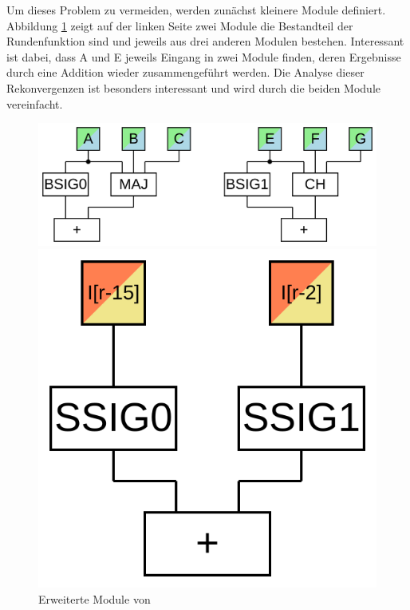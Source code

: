 Um dieses Problem zu vermeiden, werden zunächst kleinere Module definiert. Abbildung \ref{fig:sha256M} zeigt auf der linken
Seite zwei Module die Bestandteil der Rundenfunktion sind und jeweils aus drei anderen Modulen bestehen. Interessant ist dabei,
dass A und E jeweils Eingang in zwei Module finden, deren Ergebnisse durch eine Addition wieder zusammengeführt werden. Die
Analyse dieser Rekonvergenzen ist besonders interessant und wird durch die beiden Module vereinfacht.
\begin{figure}[!h]
  \centering
  \begin{minipage}[l]{9.5cm}
    \includegraphics[scale=0.4]{images/sha256coreM}
  \end{minipage}
  \begin{minipage}[l]{3cm}
    \includegraphics[scale=0.4]{images/sha256prepM}
  \end{minipage}    
  \caption{Erweiterte Module von }
  \label{fig:sha256M}
\end{figure}

